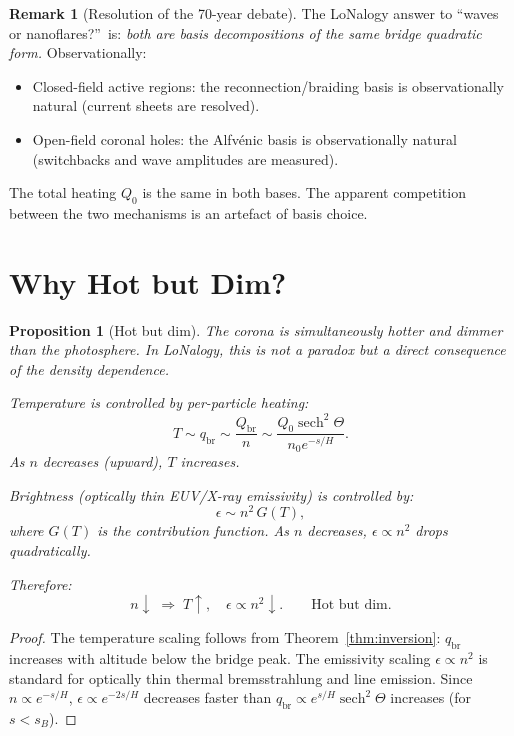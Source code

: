 \documentclass[12pt]{article}
\theoremstyle{plain}
\newtheorem{proposition}[theorem]{Proposition}
\theoremstyle{definition}
\newtheorem{remark}[theorem]{Remark}
\numberwithin{equation}{section}
\newcommand{\br}{\mathrm{br}}
\DeclareMathOperator{\sech}{sech}
\begin{document}
\begin{remark}[Resolution of the 70-year debate]
The LoNalogy answer to ``waves or nanoflares?''\ is:
\emph{both are basis decompositions of the same bridge quadratic
form.}  Observationally:
\begin{itemize}
\item Closed-field active regions: the reconnection/braiding basis
is observationally natural (current sheets are resolved).
\item Open-field coronal holes: the Alfv\'enic basis is
observationally natural (switchbacks and wave amplitudes are
measured).
\end{itemize}
The total heating $Q_0$ is the same in both bases.  The apparent
competition between the two mechanisms is an artefact of basis
choice.
\end{remark}


\section{Why Hot but Dim?}\label{sec:hotdim}

\begin{proposition}[Hot but dim]\label{prop:hotdim}
The corona is simultaneously hotter and dimmer than the photosphere.
In LoNalogy, this is not a paradox but a direct consequence of the
density dependence.

\emph{Temperature} is controlled by per-particle heating:
\begin{equation}
T \sim q_{\br} \sim \frac{Q_{\br}}{n}
\sim \frac{Q_0\sech^2\Theta}{n_0 e^{-s/H}}.
\end{equation}
As $n$ decreases (upward), $T$ increases.

\emph{Brightness} (optically thin EUV/X-ray emissivity) is
controlled by:
\begin{equation}
\epsilon \sim n^2\,G(T),
\end{equation}
where $G(T)$ is the contribution function.
As $n$ decreases, $\epsilon\propto n^2$ drops quadratically.

Therefore:
\begin{equation}
\boxed{n\downarrow \;\Longrightarrow\; T\uparrow,\quad
\epsilon\propto n^2\downarrow.
\qquad\text{Hot but dim.}}
\end{equation}
\end{proposition}

\begin{proof}
The temperature scaling follows from Theorem~\ref{thm:inversion}:
$q_{\br}$ increases with altitude below the bridge peak.  The
emissivity scaling $\epsilon\propto n^2$ is standard for optically
thin thermal bremsstrahlung and line emission.  Since $n\propto
e^{-s/H}$, $\epsilon\propto e^{-2s/H}$ decreases faster than
$q_{\br}\propto e^{s/H}\sech^2\Theta$ increases (for $s<s_B$).
\end{proof}
\end{document}
